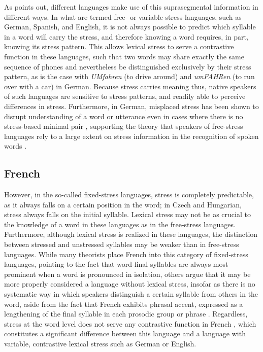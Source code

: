 					As \textcite{Cutler2005} points out, different languages make use of this suprasegmental information in different ways.
			In what are termed free- or variable-stress languages, such as German, Spanish, and English, it is not always possible to predict which syllable in a word will carry the stress, and therefore knowing a word requires, in part, knowing its stress pattern. This allows lexical stress to serve a contrastive function in these languages, such that two words may share exactly the same sequence of phones and nevertheless be distinguished exclusively by their stress pattern, as is the case with \textit{UMfahren} (to drive around) and \textit{umFAHRen} (to run over with a car) in German. %
Because stress carries meaning thus, native speakers of such languages are sensitive to stress patterns, and readily able to perceive differences in stress. %
Furthermore, in German, misplaced stress has been shown to disrupt understanding of a word or utterance even in cases where there is no stress-based minimal pair \citep{Hirschfeld1994}, supporting the theory that speakers of free-stress languages rely to a large extent on stress information in the recognition of spoken words \citep{Cutler2005}.

	\subsection{French}
	\label{sec:stress:french}

			However, in the so-called fixed-stress languages, stress is completely predictable, as it always falls on a certain position in the word;
in Czech and Hungarian, stress always falls on the initial syllable. Lexical stress may not be as crucial to the knowledge of a word in these languages as in the free-stress languages. Furthermore, although lexical stress is realized in these languages, the distinction between stressed and unstressed syllables may be weaker than in free-stress languages.
%
 While many theorists place French 
 into this category of fixed-stress languages, pointing to the fact that word-final syllables are always most prominent when a word is pronounced in isolation,
 others argue that
 it may be more properly considered a language without lexical stress, insofar as there is no systematic way in which speakers distinguish a certain syllable from others in the word, aside from the fact that French exhibits phrasal accent, expressed as a lengthening of the final syllable in each prosodic group or phrase \citep{Dupoux2008,Michaux2013}.  
 Regardless, stress at the word level does not serve any contrastive function in French \citep[p.~89]{Michaux2013}, which constitutes a significant difference between this language and a language with variable, contrastive lexical stress such as German or English.
 
